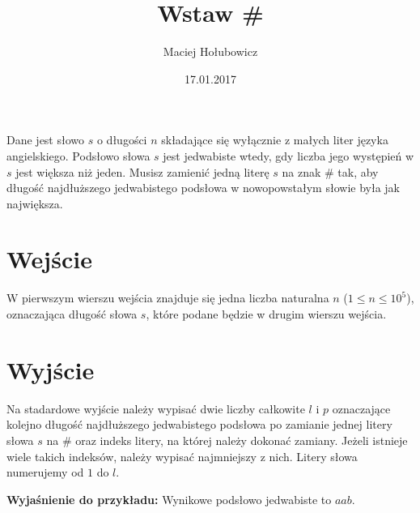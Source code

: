\documentclass[zad,zawodnik,utf8]{sinol}
\title{Wstaw \#}
\author{Maciej Hołubowicz} %
\date{17.01.2017}
\begin{document}
\begin{tasktext}%

Dane jest słowo $s$ o długości $n$ składające się wyłącznie z małych liter języka angielskiego. Podsłowo słowa $s$ jest jedwabiste wtedy, gdy liczba jego występień w $s$ 
jest większa niż jeden. Musisz zamienić jedną literę $s$ na znak \# tak, aby długość najdłuższego jedwabistego podsłowa w nowopowstałym słowie była jak największa.

  \section{Wejście}
W pierwszym wierszu wejścia znajduje się jedna liczba naturalna $n$ ($1 \leq n \leq 10^5$), oznaczająca długość słowa $s$, które podane będzie w drugim wierszu wejścia.

  \section{Wyjście}
Na stadardowe wyjście należy wypisać dwie liczby całkowite $l$ i $p$ oznaczające kolejno długość najdłuższego jedwabistego podsłowa po zamianie jednej litery słowa $s$
na \# oraz indeks litery, na której należy dokonać zamiany. Jeżeli istnieje wiele takich indeksów, należy wypisać najmniejszy z nich. Litery słowa numerujemy od $1$ do $l$.
  
\makecompactexample
\noindent
\textbf{Wyjaśnienie do przykładu:} Wynikowe podsłowo jedwabiste to $aab$.

\end{tasktext}
\end{document}
